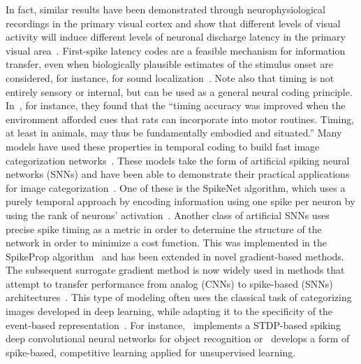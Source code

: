 \documentclass[brainsci, %
               review,accept,pdftex,moreauthors
               ]{Definitions/mdpi}
\newcommand{\mynote}[1]{{\sethlcolor{yellow}\hl{#1}}}
\begin{document}

In fact, similar results have been demonstrated through neurophysiological recordings in the primary visual cortex and show that different levels of visual activity will induce different levels of neuronal discharge latency in the primary visual area~\citep{celebrini_dynamics_1993}. First-spike latency codes are a feasible mechanism for information transfer, even when biologically plausible estimates of the stimulus onset are considered, for instance, for sound localization~\citep{chase_first-spike_2007}.  Note also that timing is not entirely sensory or internal, but can be used as a general neural coding principle. In~\citep{safaie_turning_2020}, for instance, they found that the ``timing accuracy was improved when the environment afforded cues that rats can incorporate into motor routines. Timing, at least in animals, may thus be fundamentally embodied and situated.''  Many models have used these properties in temporal coding to build fast image categorization networks~\citep{gautrais_rate_1998,delorme_spikenet_1999, perrinet_coding_2004}. These models take the form of artificial spiking neural networks (SNNs) and have been able to demonstrate their practical applications for image categorization~\citep{delorme_ultra-rapid_2000}. One of these is the SpikeNet algorithm, which uses a purely temporal approach by encoding information using one spike per neuron by using the rank of neurons' activation~\citep{delorme_spikenet_1999,bonilla_analyzing_2022}. Another class of artificial SNNs uses precise spike timing as a metric in order to determine the structure of the network in order to minimize a cost function. This was implemented in the SpikeProp algorithm~\citep{bohte_error-backpropagation_2002} and has been extended in novel gradient-based methods. The subsequent surrogate gradient method is now widely used in methods that attempt to transfer performance from analog (CNNs) to spike-based (SNNs) architectures~\citep{zenke_remarkable_2021}. This type of modeling often uses the classical task of categorizing images developed in deep learning, while adapting it to the specificity of the event-based representation~\citep{goltz_fast_2021}. For instance,~\citep{kheradpisheh_stdp-based_2018} implements a STDP-based spiking deep convolutional neural networks for object recognition or~\citep{tavanaei_representation_2018} develops a form of spike-based, competitive learning applied for unsupervised learning. 
\end{document}
